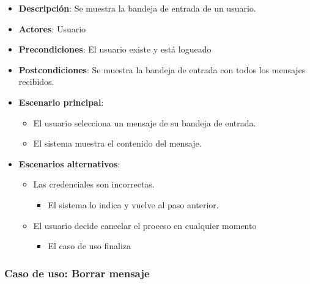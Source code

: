 \documentclass[12pt,a4paperpaper,]{report}
\providecommand{\tightlist}{%
  \setlength{\itemsep}{0pt}\setlength{\parskip}{0pt}}
\begin{document}
\begin{itemize}
\tightlist
\item
  \textbf{Descripción}: Se muestra la bandeja de entrada de un usuario.
\item
  \textbf{Actores}: Usuario
\item
  \textbf{Precondiciones}: El usuario existe y está logueado
\item
  \textbf{Postcondiciones}: Se muestra la bandeja de entrada con todos
  los mensajes recibidos.
\item
  \textbf{Escenario principal}:

  \begin{itemize}
  \tightlist
  \item
    El usuario selecciona un mensaje de su bandeja de entrada.
  \item
    El sistema muestra el contenido del mensaje.
  \end{itemize}
\item
  \textbf{Escenarios alternativos}:

  \begin{itemize}
  \tightlist
  \item
    Las credenciales son incorrectas.

    \begin{itemize}
    \tightlist
    \item
      El sistema lo indica y vuelve al paso anterior.
    \end{itemize}
  \item
    El usuario decide cancelar el proceso en cualquier momento

    \begin{itemize}
    \tightlist
    \item
      El caso de uso finaliza
    \end{itemize}
  \end{itemize}
\end{itemize}

\subsubsection{Caso de uso: Borrar
mensaje}\label{caso-de-uso-borrar-mensaje}
\end{document}
